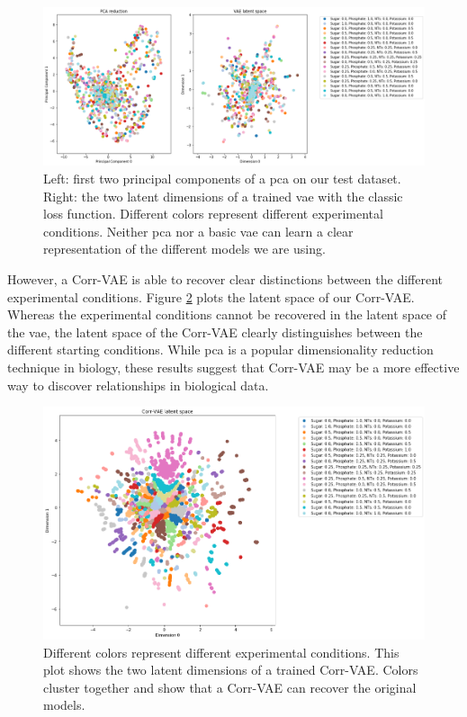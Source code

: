 \begin{figure}[t!]
\begin{center}
\includegraphics[width=1.2\textwidth]{figs/vae_vs_pca_latent.png}
\caption[Comparison of the latent dimensions \gls{pca} and \gls{vae}]{Left: first two principal components of a \gls{pca} on our test dataset.
Right: the two latent dimensions of a trained \gls{vae} with the classic loss function.
Different colors represent different experimental conditions.
Neither \gls{pca} nor a basic \gls{vae} can learn a clear representation of the different models we are using.}
\label{fig:vae_pca}
\end{center}
\end{figure}

However, a Corr-VAE is able to recover clear distinctions between the different experimental conditions.
Figure \ref{fig:corrvae_2d} plots the latent space of our Corr-VAE.
Whereas the experimental conditions cannot be recovered in the latent space of the \gls{vae}, the latent space of the Corr-VAE clearly distinguishes between the different starting conditions.
While \gls{pca} is a popular dimensionality reduction technique in biology, these results suggest that Corr-VAE may be a more effective way to discover relationships in biological data.

\begin{figure}[t!]
\begin{center}
\includegraphics[width=1.01\textwidth]{figs/corrvae_hand_2d_latent.png}
\caption[Latent dimensions of our Corr-VAE network]{Different colors represent different experimental conditions.
This plot shows the two latent dimensions of a trained Corr-VAE.
Colors cluster together and show that a Corr-VAE can recover the original models.}
\label{fig:corrvae_2d}
\end{center}
\end{figure}

